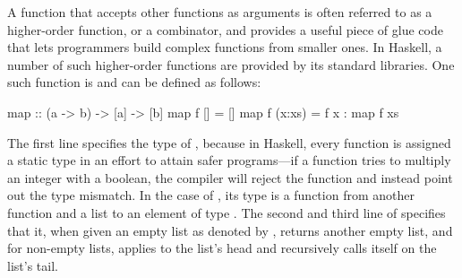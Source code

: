 \documentclass[../paper.tex]{subfiles}
\begin{document}

A function that accepts other functions as arguments is often referred to as a higher-order function, or a combinator, and provides a useful piece of glue code that lets programmers build complex functions from smaller ones. In Haskell, a number of such higher-order functions are provided by its standard libraries. One such function is  and can be defined as follows:

\begin{code}
map :: (a -> b) -> [a] -> [b]
map f []     = []
map f (x:xs) = f x : map f xs
\end{code}

The first line specifies the type of , because in Haskell, every function is assigned a static type in an effort to attain safer programs---if a function tries to multiply an integer with a boolean, the compiler will reject the function and instead point out the type mismatch. In the case of , its type is a function from another function  and a list  to an element of type . The second and third line of  specifies that it, when given an empty list as denoted by \codei{[]}, returns another empty list, and for non-empty lists, applies  to the list's head and recursively calls itself on the list's tail.





\end{document}
